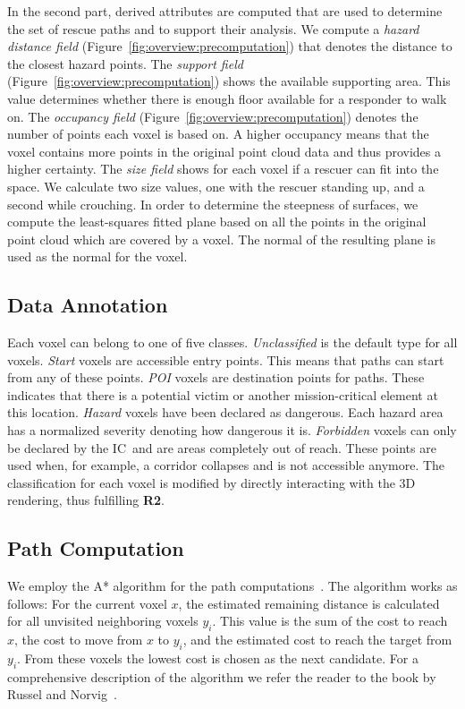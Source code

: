 \documentclass{egpubl}
\def\IC{IC}
\begin{document}
 In the second part, derived attributes are computed that are used to determine the set of rescue paths and to support their analysis. We compute a \emph{hazard distance field} (Figure~\ref{fig:overview:precomputation}) that denotes the distance to the closest hazard points. The \emph{support field} (Figure~\ref{fig:overview:precomputation}) shows the available supporting area. This value determines whether there is enough floor available for a responder to walk on. The \emph{occupancy field} (Figure~\ref{fig:overview:precomputation}) denotes the number of points each voxel is based on. A higher occupancy means that the voxel contains more points in the original point cloud data and thus provides a higher certainty. The \emph{size field} shows for each voxel if a rescuer can fit into the space. We calculate two size values, one with the rescuer standing up, and a second while crouching. In order to determine the steepness of surfaces, we compute the least-squares fitted plane based on all the points in the original point cloud which are covered by a voxel. The normal of the resulting plane is used as the normal for the voxel.

\subsection{Data Annotation} \label{sec:overview:annotation}
Each voxel can belong to one of five classes. \emph{Unclassified} is the default type for all voxels. \emph{Start} voxels are accessible entry points. This means that paths can start from any of these points. \emph{POI} voxels are destination points for paths. These indicates that there is a potential victim or another mission-critical element at this location. \emph{Hazard} voxels have been declared as dangerous. Each hazard area has a normalized severity denoting how dangerous it is. \emph{Forbidden} voxels can only be declared by the \IC\ and are areas completely out of reach. These points are used when, for example, a corridor collapses and is not accessible anymore. The classification for each voxel is modified by directly interacting with the 3D rendering, thus fulfilling {\bfseries R2}. 

\subsection{Path Computation} \label{sec:overview:pathcomputation}
We employ the A* algorithm for the path computations~\cite{4082128}. The algorithm works as follows: For the current voxel $x$, the estimated remaining distance is calculated for all unvisited neighboring voxels $y_i$. This value is the sum of the cost to reach $x$, the cost to move from $x$ to $y_i$, and the estimated cost to reach the target from $y_i$. From these voxels the lowest cost is chosen as the next candidate. For a comprehensive description of the algorithm we refer the reader to the book by Russel and Norvig~\cite{AStar}.
\end{document}
